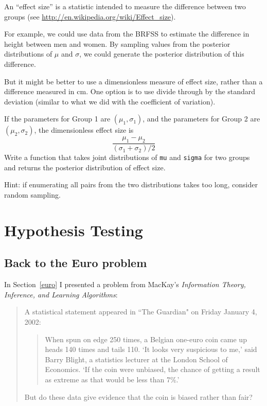 \documentclass[12pt]{book}
\begin{document}
\begin{exercise}

An ``effect size'' is a statistic intended to measure the difference
between two groups (see
\url{http://en.wikipedia.org/wiki/Effect_size}).

For example, we could use data from the BRFSS to estimate the
difference in height between men and women.  By sampling values
from the posterior distributions of $\mu$ and
$\sigma$, we could generate the posterior distribution of this
difference.

But it might be better to use a dimensionless measure of effect
size, rather than a difference measured in cm.  One option is
to use divide through by the standard deviation (similar to what
we did with the coefficient of variation).

If the parameters for Group 1 are $(\mu_1, \sigma_1)$, and the
parameters for Group 2 are $(\mu_2, \sigma_2)$, the dimensionless
effect size is
%
\[ \frac{\mu_1 - \mu_2}{(\sigma_1 + \sigma_2)/2} \]
%
Write a function that takes joint distributions of
{\tt mu} and {\tt sigma} for two groups and returns
the posterior distribution of effect size.

Hint: if enumerating all pairs from the two distributions takes too
long, consider random sampling.

\end{exercise}



\chapter{Hypothesis Testing}

\section{Back to the Euro problem}

In Section~\ref{euro} I presented a problem from MacKay's {\it Information
  Theory, Inference, and Learning Algorithms}:

\begin{quote}
A statistical statement appeared in ``The Guardian" on Friday January 4, 2002:

  \begin{quote}
        When spun on edge 250 times, a Belgian one-euro coin came
        up heads 140 times and tails 110.  `It looks very suspicious
        to me,' said Barry Blight, a statistics lecturer at the London
        School of Economics.  `If the coin were unbiased, the chance of
        getting a result as extreme as that would be less than 7\%.'
        \end{quote}

But do these data give evidence that the coin is biased rather than fair?
\end{quote}
\end{document}
